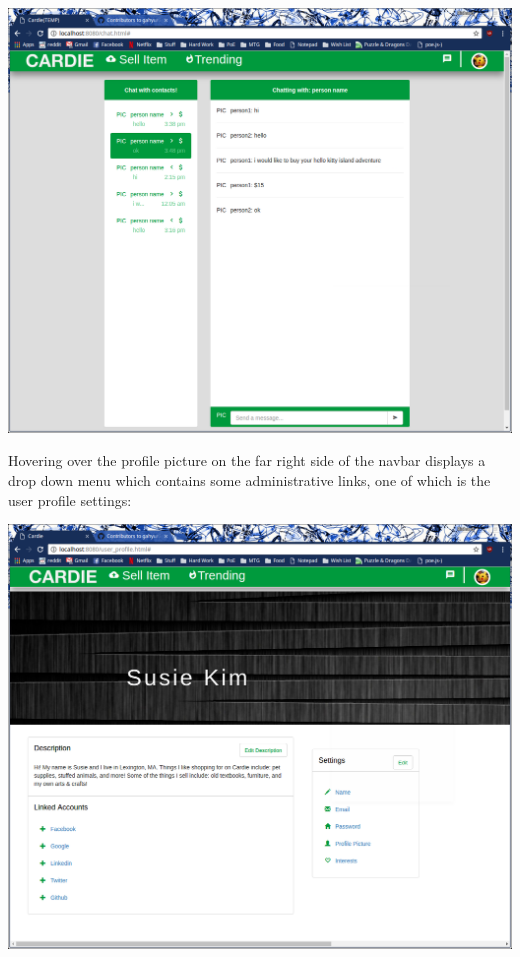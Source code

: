 \documentclass[10pt, titlepage]{article}
\begin{document}
\centerline{\includegraphics[scale=.4]{screen_04}}

\pagebreak

\noindent Hovering over the profile picture on the far right side of the navbar displays a drop down menu which contains some administrative links, one of which is the user profile settings: \\

\centerline{\includegraphics[scale=.4]{screen_06}}

\pagebreak
\end{document}
